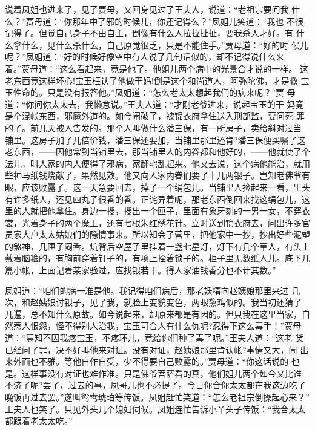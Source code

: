 说着凤姐也进来了，见了贾母，又回身见过了王夫人，说道：“老祖宗要问我
什么？”贾母道：“你那年中了邪的时候儿，你还记得么？”凤姐儿笑道：“我也
不很记得了。但觉自己身子不由自主，倒像有什么人拉拉扯扯，要我杀人才好。有
什么拿什么，见什么杀什么，自己原觉很乏，只是不能住手。”贾母道：“好的时
候儿呢？”凤姐道：“好的时候好像空中有人说了几句话似的，却不记得说什么来
着。”贾母道：“这么看起来，竟是他了。他姐儿两个病中的光景合才说的一样。
这老东西竟这样坏心!宝玉枉认了他做干妈!倒是这个和尚道人，阿弥陀佛，才是救
宝玉性命的。只是没有报答他。”凤姐道：“怎么老太太想起我们的病来呢？”贾
母道：“你问你太太去，我懒怠说。”王夫人道：“才刚老爷进来，说起宝玉的干
妈竟是个混帐东西，邪魔外道的。如今闹破了，被锦衣府拿住送入刑部监，要问死
罪的了。前几天被人告发的。那个人叫做什么潘三保，有一所房子，卖给斜对过当
铺里。这房子加了几倍价钱，潘三保还要加，当铺里那里还肯?潘三保便买嘱了这
老东西，——因他常到当铺里去，那当铺里人的内眷都和他好的，——他就使了个
法儿，叫人家的内人便得了邪病，家翻宅乱起来。他又去说，这个病他能治，就用
些神马纸钱烧献了，果然见效。他又向人家内眷们要了十几两银子。岂知老佛爷有
眼，应该败露了。这一天急要回去，掉了一个绢包儿。当铺里人捡起来一看，里头
有许多纸人，还见四丸子很香的香。正诧异着呢，那老东西倒回来找这绢包儿，这
里的人就把他拿住。身边一搜，搜出一个匣子，里面有象牙刻的一男一女，不穿衣
裳，光着身子的两个魔王，还有七根朱红绣花针。立时送到锦衣府去，问出许多官
员家大户太太姑娘们的隐情事来。所以知会了营里，把他家中一抄，抄出好些泥塑
的煞神，几匣子闷香。炕背后空屋子里挂着一盏七星灯，灯下有几个草人，有头上
戴着脑箍的，有胸前穿着钉子的，有项上拴着锁子的。柜子里无数纸人儿。底下几
篇小帐，上面记着某家验过，应找银若干。得人家油钱香分也不计其数。”

凤姐道：“咱们的病一准是他。我记得咱们病后，那老妖精向赵姨娘那里来过
几次，和赵姨娘讨银子，见了我，就脸上变貌变色，两眼黧鸡似的。我当初还猜了
几遍，总不知什么原故。如今说起来，却原来都是有因的。但只我在这里当家，自
然惹人恨怨，怪不得别人治我，宝玉可合人有什么仇呢?忍得下这么毒手！”贾母
道：“焉知不因我疼宝玉，不疼环儿，竟给你们种了毒了呢。”王夫人道：“这老
货已经问了罪，决不好叫他来对证。没有对证，赵姨娘那里肯认帐?事情又大，闹
出来外面也不雅。等他自作自受，少不得要自己败露的。”贾母道：“你这话说的
也是。这样事没有对证也难作准。只是佛爷菩萨看的真，他们姐儿两个如今又比谁
不济了呢?罢了，过去的事，凤哥儿也不必提了。今日你合你太太都在我这边吃了
晚饭再过去罢。”遂叫鸳鸯琥珀等传饭。凤姐赶忙笑道：“怎么老祖宗倒操起心来？”
王夫人也笑了。只见外头几个媳妇伺候。凤姐连忙告诉小丫头子传饭：“我合太太
都跟着老太太吃。”

